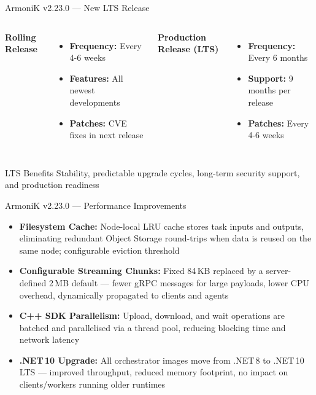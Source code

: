 \begin{frame}{ArmoniK v2.23.0 — New LTS Release}
	\begin{columns}[T]
		\textbf{Rolling Release}
		\begin{itemize}
			\item \textbf{Frequency:} Every 4-6 weeks
			\item \textbf{Features:} All newest developments
			\item \textbf{Patches:} CVE fixes in next release
		\end{itemize}

		\textbf{Production Release (LTS)}
		\begin{itemize}
			\item \textbf{Frequency:} Every 6 months
			\item \textbf{Support:} 9 months per release
			\item \textbf{Patches:} Every 4-6 weeks
		\end{itemize}
	\end{columns}

	\vspace{1em}
	\begin{block}{LTS Benefits}
		Stability, predictable upgrade cycles, long-term security support, and production readiness
	\end{block}
\end{frame}

\begin{frame}{ArmoniK v2.23.0 — Performance Improvements}
	\begin{itemize}
		\item \textbf{Filesystem Cache:} Node-local LRU cache stores task inputs and outputs, eliminating redundant Object Storage round-trips when data is reused on the same node; configurable eviction threshold
		\item \textbf{Configurable Streaming Chunks:} Fixed 84\,KB replaced by a server-defined 2\,MB default — fewer gRPC messages for large payloads, lower CPU overhead, dynamically propagated to clients and agents
		\item \textbf{C++ SDK Parallelism:} Upload, download, and wait operations are batched and parallelised via a thread pool, reducing blocking time and network latency
		\item \textbf{.NET\,10 Upgrade:} All orchestrator images move from .NET\,8 to .NET\,10 LTS — improved throughput, reduced memory footprint, no impact on clients/workers running older runtimes
	\end{itemize}
\end{frame}

